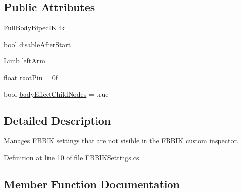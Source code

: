 \subsection*{Public Attributes}
\begin{DoxyCompactItemize}
\item 
\mbox{\hyperlink{class_root_motion_1_1_final_i_k_1_1_full_body_biped_i_k}{Full\+Body\+Biped\+IK}} \mbox{\hyperlink{class_root_motion_1_1_demos_1_1_f_b_b_i_k_settings_a2cc52116dcf0475d0affbe75c7f16e07}{ik}}
\item 
bool \mbox{\hyperlink{class_root_motion_1_1_demos_1_1_f_b_b_i_k_settings_afdf3f7cb8db998d608d7ee2680716f96}{disable\+After\+Start}}
\item 
\mbox{\hyperlink{class_root_motion_1_1_demos_1_1_f_b_b_i_k_settings_1_1_limb}{Limb}} \mbox{\hyperlink{class_root_motion_1_1_demos_1_1_f_b_b_i_k_settings_aff0dc556e2cef1746d05599cb25a9fbc}{left\+Arm}}
\item 
float \mbox{\hyperlink{class_root_motion_1_1_demos_1_1_f_b_b_i_k_settings_a38e1fa42788a06737cb4e9658029d6d8}{root\+Pin}} = 0f
\item 
bool \mbox{\hyperlink{class_root_motion_1_1_demos_1_1_f_b_b_i_k_settings_aaaa60622560ea7f7209ec1419d1288b8}{body\+Effect\+Child\+Nodes}} = true
\end{DoxyCompactItemize}


\subsection{Detailed Description}
Manages F\+B\+B\+IK settings that are not visible in the F\+B\+B\+IK custom inspector. 



Definition at line 10 of file F\+B\+B\+I\+K\+Settings.\+cs.



\subsection{Member Function Documentation}
\mbox{\label{class_root_motion_1_1_demos_1_1_f_b_b_i_k_settings_a52f18bfc4d5ae0c3757778c07a701473}} 
